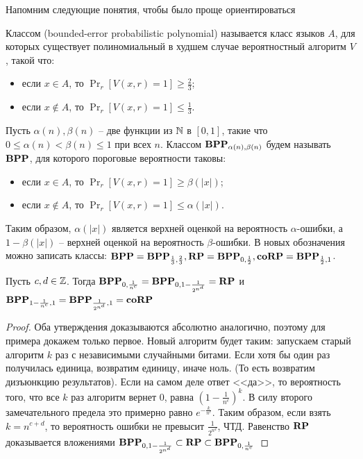 Напомним следующие понятия, чтобы было проще ориентироваться

\begin{definition} Классом \bpp (bounded-error probabilistic polynomial) называется класс языков $A$, для которых существует полиномиальный в худшем случае вероятностный алгоритм $V$, такой что:
\begin{itemize}
    \item если $x \in A$, то $\Pr_r[V(x, r) = 1] \geq \frac{2}{3}$;
    \item если $x \not\in A$, то $\Pr_r[V(x, r) = 1] \leq \frac{1}{3}$.
\end{itemize}
\end{definition}


\begin{definition} Пусть $\alpha (n), \beta(n)$ -- две функции из $\mathbb{N}$ в $[0,1]$, такие что $0 \leq \alpha(n) < \beta(n) \leq 1$ при всех $n$. Классом $\textbf{BPP}_{\alpha(n), \beta(n)}$ будем называть $\textbf{BPP}$, для которого пороговые вероятности таковы:
\begin{itemize}
    \item если $x \in A$, то $\Pr_r[V(x, r) = 1] \geq \beta(|x|)$;
    \item если $x \not\in A$, то $\Pr_r[V(x, r) = 1] \leq \alpha(|x|)$.
\end{itemize}
\end{definition}

Таким образом, $\alpha(|x|)$ является верхней оценкой на вероятность $\alpha$-ошибки, а $1-\beta(|x|)$ -- верхней оценкой на вероятность $\beta$-ошибки.
В новых обозначения можно записать классы: $\textbf{BPP} = \textbf{BPP}_{\frac{1}{3}, \frac{2}{3}}, \textbf{RP} = \textbf{BPP}_{0, \frac{1}{2}}, \textbf{coRP} = \textbf{BPP}_{\frac{1}{2}, 1}$.

\begin{theorem}
Пусть $c, d \in \mathbb{Z}$. Тогда $\textbf{BPP}_{0, \frac{1}{n^c}} = \textbf{BPP}_{0, 1 - \frac{1}{2^{n^d}}} = \textbf{RP}$ и $\textbf{BPP}_{1 - \frac{1}{n^c}, 1} = \textbf{BPP}_{\frac{1}{2^{n^d}}, 1} = \textbf{coRP}$
\end{theorem}

\begin{proof}
Оба утверждения доказываются абсолютно аналогично, поэтому для примера докажем только первое. Новый алгоритм будет таким: запускаем старый алгоритм $k$ раз с независимыми случайными битами. Если хотя бы один раз получилась единица, возвратим единицу, иначе ноль. (То есть возвратим дизъюнкцию результатов). Если на самом деле ответ <<да>>, то вероятность того, что все $k$ раз алгоритм вернет $0$, равна $(1 - \frac{1}{n^c})^k$. В силу второго замечательного предела это примерно равно $e^{-\frac{k}{n^c}}$. Таким образом, если взять $k = n^{c+d}$, то вероятность ошибки не превысит $\frac{1}{2^{n^d}}$, ЧТД. Равенство $\textbf{RP}$ доказывается вложениями $\textbf{BPP}_{0, 1 - \frac{1}{2^{n^d}}} \subset \textbf{RP} \subset \textbf{BPP}_{0, \frac{1}{n^c}}$
\end{proof}


